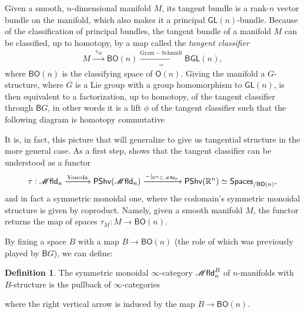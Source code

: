 \documentclass[12pt,a4paper]{article}
\newcounter{counter} \numberwithin{counter}{section}
\theoremstyle{definition}
\newtheorem{definition}[counter]{Definition}
\theoremstyle{plain}
\theoremstyle{remark}
\newcommand{\mfld}[1][s]{%
    \ifx r#1\mathsf{Mfld}\else
    \ifx s#1\mathscr{M} \mathsf{fld}\else
    \mathrm{Illegal~option}%
    \fi\fi
}
\begin{document}
Given a smooth, $n$-dimensional manifold $M$, its tangent bundle is a rank-$n$ vector bundle on the manifold, which also makes it a principal $\mathsf{GL}(n)$-bundle. Because of the classification of principal bundles, the tangent bundle of a manifold $M$ can be classified, up to homotopy, by a map called the \emph{tangent classifier}
%
\begin{align}
    M \xrightarrow{\ \ \tau_M \ \ } \mathsf{BO}(n) \xrightarrow[\simeq]{\mathrm{Gram-Schmidt}} \mathsf{BGL}(n),
\end{align}
%
where $\mathsf{BO}(n)$ is the classifying space of $\mathsf{O}(n)$. Giving the manifold a $G$-structure, where $G$ is a Lie group with a group homomorphism to $\mathsf{GL}(n)$, is then equivalent to a factorization, up to homotopy, of the tangent classifier through $\mathsf{B}G$, in other words it is a lift $\phi$ of the tangent classifier such that the following diagram is homotopy commutative
%
\begin{center}
\end{center}

It is, in fact, this picture that will generalize to give us tangential structure in the more general case. As a first step, \cite[cor.2.13]{af_fhtop} shows that the tangent classifier can be understood as a functor
%
\begin{align}
    \tau: \mfld_n \xrightarrow{\mathrm{Yoneda}} \mathsf{PShv}(\mfld_n) \xrightarrow{-|_{\mathbb{R}^n \subset \mfld_n}} \mathsf{PShv}(\mathbb{R}^n) \simeq \mathsf{Spaces}_{/\mathsf{BO}(n)},
\end{align}
%
and in fact a symmetric monoidal one, where the codomain's symmetric monoidal structure is given by coproduct. Namely, given a smooth manifold $M$, the functor returns the map of spaces $\tau_M:M \rightarrow \mathsf{BO}(n)$.

By fixing a space $B$ with a map $B \rightarrow \mathsf{BO}(n)$ (the role of which was previously played by $\mathsf{B}G$), we can define:
%
\begin{definition}
    The symmetric monoidal $\infty$-category $\mfld_n^B$ of $n$-manifolds with $B$-structure is the pullback of $\infty$-categories
    \begin{center}
    \end{center}
    where the right vertical arrow is induced by the map $B \rightarrow \mathsf{BO}(n)$.
\end{definition}
\end{document}
